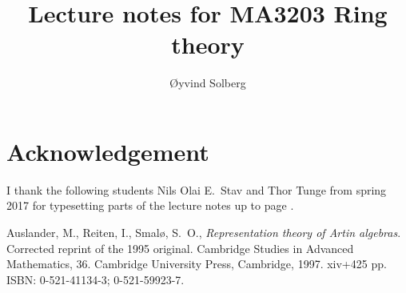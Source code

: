 \documentclass{amsart}
\numberwithin{equation}{section}
\theoremstyle{definition}
\begin{document}
\title{Lecture notes for MA3203 Ring theory}

\author{\O yvind Solberg}
\address{Department of Mathematical Sciences\\
NTNU\\
N-7491 Trondheim, Norway}

\maketitle
\tableofcontents

\section*{Acknowledgement}
I thank the following students Nils Olai E.\ Stav and Thor Tunge from
spring 2017 for typesetting parts of the lecture notes up to page
\pageref{2017-pages}.





	

\printindex
\begin{thebibliography}{ARS}
 Auslander, M., Reiten, I., Smal\o, S.\ O.,
  \emph{Representation theory of Artin algebras}. Corrected reprint of
  the 1995 original. Cambridge Studies in Advanced Mathematics,
  36. Cambridge University Press, Cambridge, 1997. xiv+425 pp. ISBN:
  0-521-41134-3; 0-521-59923-7.
\end{thebibliography}
\end{document}
